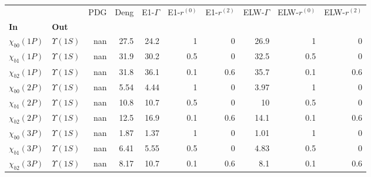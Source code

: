 \begin{tabular}{l|l|r|r|r|r|r|r|r|r}
\toprule
                &                &  PDG &  Deng &  E1-$\Gamma$ &  E1-$r^{(0)}$ &  E1-$r^{(2)}$ &  ELW-$\Gamma$ &  ELW-$r^{(0)}$ &  ELW-$r^{(2)}$ \\
\textbf{In} & \textbf{Out} &      &       &              &               &               &               &                &                \\
\midrule
\textbf{$\chi_{b0}(1P)$} & \textbf{$\Upsilon(1S)$} &  nan &  27.5 &         24.2 &             1 &             0 &          26.9 &              1 &              0 \\
\textbf{$\chi_{b1}(1P)$} & \textbf{$\Upsilon(1S)$} &  nan &  31.9 &         30.2 &           0.5 &             0 &          32.5 &            0.5 &              0 \\
\textbf{$\chi_{b2}(1P)$} & \textbf{$\Upsilon(1S)$} &  nan &  31.8 &         36.1 &           0.1 &           0.6 &          35.7 &            0.1 &            0.6 \\
\textbf{$\chi_{b0}(2P)$} & \textbf{$\Upsilon(1S)$} &  nan &  5.54 &         4.44 &             1 &             0 &          3.97 &              1 &              0 \\
\textbf{$\chi_{b1}(2P)$} & \textbf{$\Upsilon(1S)$} &  nan &  10.8 &         10.7 &           0.5 &             0 &            10 &            0.5 &              0 \\
\textbf{$\chi_{b2}(2P)$} & \textbf{$\Upsilon(1S)$} &  nan &  12.5 &         16.9 &           0.1 &           0.6 &          14.1 &            0.1 &            0.6 \\
\textbf{$\chi_{b0}(3P)$} & \textbf{$\Upsilon(1S)$} &  nan &  1.87 &         1.37 &             1 &             0 &          1.01 &              1 &              0 \\
\textbf{$\chi_{b1}(3P)$} & \textbf{$\Upsilon(1S)$} &  nan &  6.41 &         5.55 &           0.5 &             0 &          4.83 &            0.5 &              0 \\
\textbf{$\chi_{b2}(3P)$} & \textbf{$\Upsilon(1S)$} &  nan &  8.17 &         10.7 &           0.1 &           0.6 &           8.1 &            0.1 &            0.6 \\
\bottomrule
\end{tabular}
